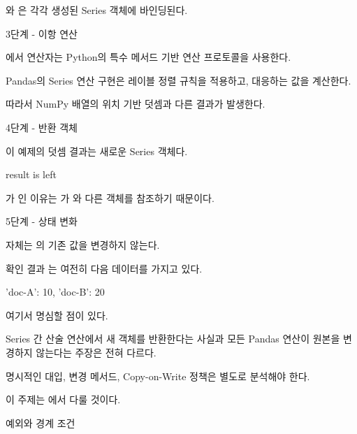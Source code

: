 와 은 각각 생성된 Series 객체에 바인딩된다.

\begin{dhknote}
\begin{dhksmry}[centered]
3단계 - 이항 연산
\end{dhksmry}
\end{dhknote}

에서 \zsh{+} 연산자는 Python의 특수 메서드 기반 연산 프로토콜을 사용한다.

Pandas의 Series 연산 구현은 레이블 정렬 규칙을 적용하고, 대응하는 값을 계산한다.

따라서 NumPy 배열의 위치 기반 덧셈과 다른 결과가 발생한다.

\begin{dhknote}
\begin{dhksmry}[centered]
4단계 - 반환 객체
\end{dhksmry}
\end{dhknote}

이 예제의 덧셈 결과는 새로운 Series 객체다.

\begin{dhkcode}
result is left
\end{dhkcode}

가 인 이유는 가 와 다른 객체를 참조하기 때문이다.

\begin{dhknote}
\begin{dhksmry}[centered]
5단계 - 상태 변화
\end{dhksmry}
\end{dhknote}

 자체는 의 기존 값을 변경하지 않는다.

확인 결과 는 여전히 다음 데이터를 가지고 있다.

\begin{dhkzsh}
{'doc-A': 10, 'doc-B': 20}
\end{dhkzsh}

여기서 명심할 점이 있다.

Series 간 산술 연산에서 새 객체를 반환한다는 사실과 모든 Pandas 연산이 원본을 변경하지 않는다는 주장은 전혀 다르다.

명시적인 대입, 변경 메서드, Copy-on-Write 정책은 별도로 분석해야 한다.

이 주제는 에서 다룰 것이다.

\begin{dhknote}
\begin{dhksmry}[centered]
예외와 경계 조건
\end{dhksmry}
\end{dhknote}

